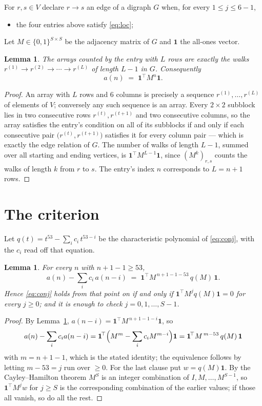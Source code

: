 \documentclass[11pt,a4paper]{article}
\theoremstyle{plain}
\newtheorem{lemma}[theorem]{Lemma}
\theoremstyle{definition}
\begin{document}
For $r,s\in V$ declare $r\to s$ an edge of a digraph $G$ when, for every
$1\le j\le 6-1$,
\begin{itemize}
\item the four entries above satisfy \eqref{eq:loc};

\end{itemize}
Let $M\in\{0,1\}^{S\times S}$ be the adjacency matrix of $G$ and $\mathbf{1}$ the
all-ones vector.

\begin{lemma}\label{lem:walk}
The arrays counted by the entry with $L$ rows are exactly the walks
$r^{(1)}\to r^{(2)}\to\cdots\to r^{(L)}$ of length $L-1$ in $G$. Consequently
\[
a(n)\;=\;\mathbf{1}^{\!\top}M^{n}\mathbf{1} .
\]
\end{lemma}

\begin{proof}
An array with $L$ rows and $6$ columns is precisely a sequence
$r^{(1)},\dots,r^{(L)}$ of elements of $V$; conversely any such sequence is an array.
Every $2\times2$ subblock lies in two consecutive rows $r^{(t)},r^{(t+1)}$ and two
consecutive columns, so the array satisfies the entry's condition on all of its subblocks
if and only if each consecutive pair $\bigl(r^{(t)},r^{(t+1)}\bigr)$ satisfies it for
every column pair --- which is exactly the edge relation of $G$. The number of walks of
length $L-1$, summed over all starting and ending vertices, is
$\mathbf{1}^{\!\top}M^{L-1}\mathbf{1}$, since $(M^{k})_{r,s}$ counts the walks of
length $k$ from $r$ to $s$. The entry's index $n$ corresponds to $L=n+1$ rows.
\end{proof}

\section{The criterion}

Let $q(t)=t^{53}-\sum_i c_i\,t^{53-i}$ be the characteristic polynomial of
\eqref{eq:conj}, with the $c_i$ read off that equation.

\begin{lemma}\label{lem:crit}
For every $n$ with $n+1-1\ge53$,
\[
a(n)-\sum_i c_i\,a(n-i)\;=\;\mathbf{1}^{\!\top}M^{\,n+1-1-53}\,q(M)\,\mathbf{1} .
\]
Hence \eqref{eq:conj} holds from that point on if and only if
$\mathbf{1}^{\!\top}M^{j}q(M)\mathbf{1}=0$ for every $j\ge0$; and it is enough to check
$j=0,1,\dots,S-1$.
\end{lemma}

\begin{proof}
By Lemma~\ref{lem:walk}, $a(n-i)=\mathbf{1}^{\!\top}M^{\,n+1-1-i}\mathbf{1}$, so
\[
a(n)-\sum_i c_i a(n-i)
=\mathbf{1}^{\!\top}\Bigl(M^{m}-\sum_i c_i M^{m-i}\Bigr)\mathbf{1}
=\mathbf{1}^{\!\top}M^{\,m-53}\,q(M)\,\mathbf{1}
\]
with $m=n+1-1$, which is the stated identity; the equivalence follows by letting
$m-53=j$ run over $\ge0$. For the last clause put $w=q(M)\mathbf{1}$. By the
Cayley--Hamilton theorem $M^{S}$ is an integer combination of $I,M,\dots,M^{S-1}$, so
$\mathbf{1}^{\!\top}M^{j}w$ for $j\ge S$ is the corresponding combination of the earlier
values; if those all vanish, so do all the rest.
\end{proof}
\end{document}
